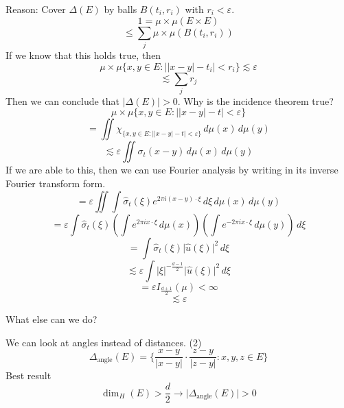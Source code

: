 \documentclass[12pt]{article}
\begin{document}
Reason: Cover $\Delta(E)$ by balls $B(t_i, r_i)$ with $r_i < \varepsilon$. 
$$1 = \mu \times \mu(E\times E)$$
$$ \leq \sum_j \mu\times\mu(B(t_i,r_i))$$
If we know that this holds true, then 
$$\mu \times \mu \{x,y \in E : \vert\vert x-y \vert -t_i \vert < r_i \} \lesssim \varepsilon$$
$$\lesssim \sum_j r_j$$
Then we can conclude that $\vert \Delta(E) \vert > 0$. Why is the incidence theorem true? 
$$\mu \times \mu\{ x,y \in E : \vert \vert x-y\vert - t \vert < \varepsilon \}$$
$$=\iint \chi_{\{x,y \in E : \vert \vert x-y \vert - t\vert < \varepsilon\}} \,d\mu(x) \,d\mu(y)$$
$$\lesssim \varepsilon \iint \sigma_t(x-y)\,d\mu(x)\,d\mu(y)$$
If we are able to this, then we can use Fourier analysis by writing in its inverse Fourier transform form. 
$$= \varepsilon \iint \int \hat{\sigma}_t (\xi) e^{2\pi i (x-y) \cdot\xi} \, d\xi \,d\mu(x) \, d\mu(y)$$
$$ = \varepsilon \int \hat{\sigma}_t(\xi) (\int e^{2\pi i x \cdot \xi}\, d\mu(x))(\int e^{-2\pi i x \cdot \xi}\, d\mu(y))\, d\xi$$
$$= \int \hat{\sigma}_t(\xi) \vert \hat{u}(\xi)\vert^2 \, d\xi$$
$$\lesssim \varepsilon \int \vert \xi \vert^{-\frac{d-1}{2}} \vert \hat{u} (\xi) \vert^2 \, d\xi$$
$$= \varepsilon I_{\frac{d+1}{2}}(\mu) <\infty$$
$$\lesssim \varepsilon$$

What else can we do? 

\noindent We can look at angles instead of distances. (2)
$$\Delta_{\text{angle}}(E) = \{ \frac{x-y}{\vert x-y\vert} \cdot \frac{z-y}{\vert z-y \vert}: x,y,z \in E\}$$
Best result
$$\dim_H(E)> \frac{d}{2} \rightarrow \vert \Delta_{\text{angle}}(E)\vert >0$$
\end{document}
